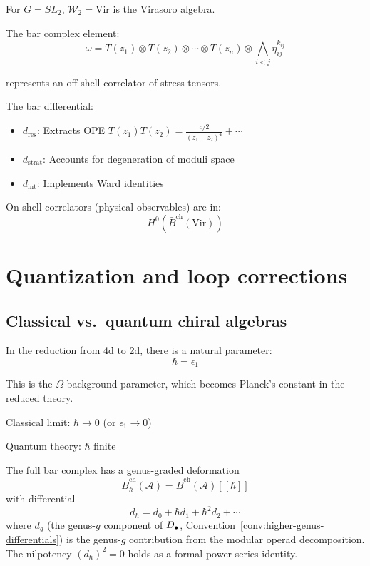 \begin{example}[Virasoro = \texorpdfstring{$\mathcal{W}_2$}{W_2}]
For $G = SL_2$, $\mathcal{W}_2 = \text{Vir}$ is the Virasoro algebra.

The bar complex element:
\[\omega = T(z_1) \otimes T(z_2) \otimes \cdots \otimes T(z_n) \otimes 
\bigwedge_{i<j} \eta_{ij}^{k_{ij}}\]

represents an off-shell correlator of stress tensors.

The bar differential:
\begin{itemize}
\item $d_{\text{res}}$: Extracts OPE $T(z_1)T(z_2) = \frac{c/2}{(z_1-z_2)^4} + \cdots$
\item $d_{\text{strat}}$: Accounts for degeneration of moduli space
\item $d_{\text{int}}$: Implements Ward identities
\end{itemize}

On-shell correlators (physical observables) are in:
\[H^0(\bar{B}^{\text{ch}}(\text{Vir}))\]
\end{example}

\section{Quantization and loop corrections}

\subsection{Classical vs.\ quantum chiral algebras}

\begin{definition}
In the reduction from 4d to 2d, there is a natural parameter:
\[\hbar = \epsilon_1\]

This is the $\Omega$-background parameter, which becomes Planck's constant in 
the reduced theory.

Classical limit: $\hbar \to 0$ (or $\epsilon_1 \to 0$)

Quantum theory: $\hbar$ finite
\end{definition}

\begin{theorem}
\label{thm:genus-graded-bar}
The full bar complex has a genus-graded deformation
\[\bar{B}^{\mathrm{ch}}_\hbar(\mathcal{A}) = \bar{B}^{\mathrm{ch}}(\mathcal{A})[[\hbar]]\]
with differential
\[d_\hbar = d_0 + \hbar d_1 + \hbar^2 d_2 + \cdots\]
where $d_g$ (the genus-$g$ component of $D_{\bullet}$, Convention~\ref{conv:higher-genus-differentials}) is the genus-$g$ contribution from the modular operad decomposition.
The nilpotency $(d_\hbar)^2 = 0$ holds as a formal power series identity.
\end{theorem}

